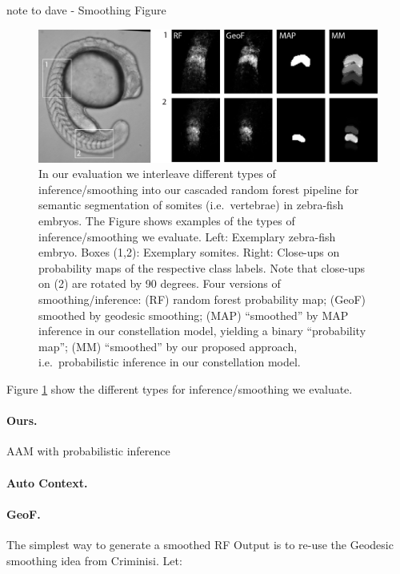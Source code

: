\documentclass[10pt,twocolumn,letterpaper]{article}
\begin{document}
note to dave - Smoothing Figure
\begin{figure}[t]
\begin{center}
\includegraphics[width=\columnwidth]{smoothing.jpg} %
\caption{In our evaluation we interleave different types of inference/smoothing into our cascaded random forest pipeline for semantic segmentation of somites (i.e.\ vertebrae) in zebra-fish embryos. 
%
The Figure shows examples of the types of inference/smoothing we evaluate. 
Left: Exemplary zebra-fish embryo. Boxes (1,2): Exemplary somites. Right: Close-ups on probability maps of the respective class labels. Note that close-ups on (2) are rotated by 90 degrees. 
%
Four versions of smoothing/inference: (RF) random forest probability map; (GeoF) smoothed by geodesic smoothing\cite{GeoF2013}; (MAP) "`smoothed"' by MAP inference in our constellation model, yielding a binary "`probability map"'; 
%
(MM) "`smoothed"' by our proposed approach, i.e.\ probabilistic inference in our constellation model.  }
\label{fig:smoothing}
\end{center}
\end{figure}
%



Figure \ref{fig:smoothing} show the different types for inference/smoothing we evaluate. 



\paragraph{Ours. }
AAM with probabilistic inference 



\paragraph{Auto Context. }

\paragraph{GeoF. }
The simplest way to generate a smoothed RF Output is to re-use the Geodesic smoothing idea from Criminisi.  Let:
\end{document}
